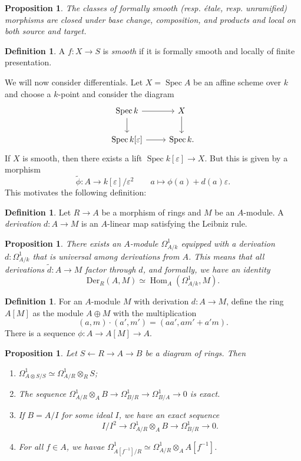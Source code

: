 \documentclass[leqno, openany]{memoir}
\newtheorem{prop}[thm]{Proposition}
\theoremstyle{definition}
\newtheorem{defn}[thm]{Definition}
\theoremstyle{remark}
\theoremstyle{plain}
\theoremstyle{definition}
\theoremstyle{remark}
\newcommand{\ep}{\varepsilon}
\newcommand{\mr}[1]{\mathrm{#1}}
\newcommand{\wt}[1]{\widetilde{#1}}
\DeclareMathOperator{\Hom}{Hom}
\DeclareMathOperator{\Spec}{Spec}
\begin{document}
\begin{prop}
    The classes of formally smooth (resp. \'etale, resp. unramified) morphisms are closed under base change, composition, and products and local on both source and target.
\end{prop}

\begin{defn}
    A $f \colon X \to S$ is \textit{smooth} if it is formally smooth and locally of finite presentation.
\end{defn}

We will now consider differentials. Let $X = \Spec A$ be an affine scheme over $k$ and choose a $k$-point and consider the diagram
\begin{equation*}
\begin{tikzcd}
    \Spec k \ar{r} \ar{d} & X \ar{d} \\
    \Spec k[\ep] \ar{r} & \Spec k.
\end{tikzcd}
\end{equation*}
If $X$ is smooth, then there exists a lift $\Spec k[\ep] \to X$. But this is given by a morphism
\[ \wt{\phi} \colon A \to k[\ep] / \ep^2 \qquad a \mapsto \phi(a) + d(a) \ep. \]
This motivates the following definition:
\begin{defn}
    Let $R \to A$ be a morphism of rings and $M$ be an $A$-module. A \textit{derivation} $d \colon A \to M$ is an $A$-linear map satisfying the Leibniz rule.
\end{defn}

\begin{prop}
    There exists an $A$-module $\Omega^1_{A/k}$ equipped with a derivation $d \colon \Omega^1_{A/k}$ that is universal among derivations from $A$. This means that all derivations $\wt{d} \colon A \to M$ factor through $d$, and formally, we have an identity
    \[ \mr{Der}_R(A,M) \simeq \Hom_A(\Omega^1_{A/k}, M). \]
\end{prop}

\begin{defn}
    For an $A$-module $M$ with derivation $d \colon A \to M$, define the ring $A[M]$ as the module $A \oplus M$ with the multiplication
    \[ (a,m) \cdot (a', m') = (aa', am' + a'm). \]
    There is a sequence $\phi \colon A \to A[M] \to A$.
\end{defn}

\begin{prop}
    Let $S \gets R \to A \to B$ be a diagram of rings. Then
    \begin{enumerate}
        \item $\Omega^1_{A \otimes S / S} \simeq \Omega^1_{A/R} \otimes_R S$;
        \item The sequence $\Omega^1_{A/R} \otimes_A B \to \Omega^1_{B/R} \to \Omega^1_{B/A} \to 0$ is exact.
        \item If $B = A/I$ for some ideal $I$, we have an exact sequence
            \[ I/I^2 \to \Omega^1_{A/R} \otimes_A B \to \Omega^1_{B/R} \to 0. \]
        \item For all $f \in A$, we havae $\Omega^1_{A[f^{-1}]/R} \simeq \Omega^1_{A/R} \otimes_A A[f^{-1}]$.
    \end{enumerate}
\end{prop}
\end{document}

